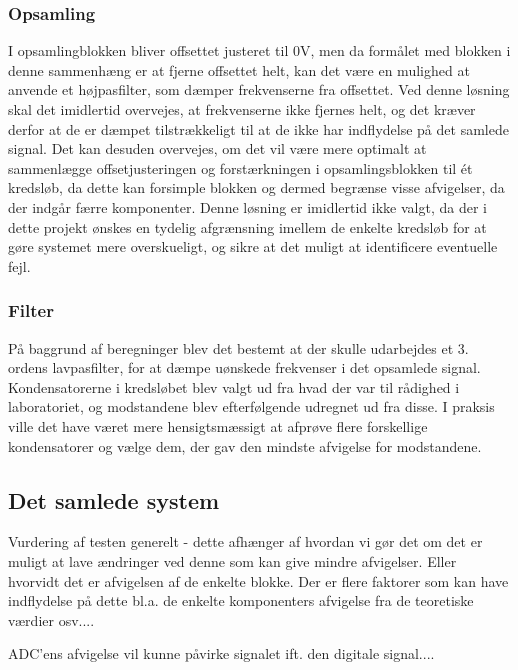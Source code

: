 \subsubsection{Opsamling}
I opsamlingblokken bliver offsettet justeret til $0$V, men da formålet med blokken i denne sammenhæng er at fjerne offsettet helt, kan det være en mulighed at anvende et højpasfilter, som dæmper frekvenserne fra offsettet. Ved denne løsning skal det imidlertid overvejes, at frekvenserne ikke fjernes helt, og det kræver derfor at de er dæmpet tilstrækkeligt til at de ikke har indflydelse på det samlede signal. Det kan desuden overvejes, om det vil være mere optimalt at sammenlægge offsetjusteringen og forstærkningen i opsamlingsblokken til ét kredsløb, da dette kan forsimple blokken og dermed begrænse visse afvigelser, da der indgår færre komponenter. Denne løsning er imidlertid ikke valgt, da der i dette projekt ønskes en tydelig afgrænsning imellem de enkelte kredsløb for at gøre systemet mere overskueligt, og sikre at det muligt at identificere eventuelle fejl. 
\subsubsection{Filter}
På baggrund af beregninger blev det bestemt at der skulle udarbejdes et 3. ordens lavpasfilter, for at dæmpe uønskede frekvenser i det opsamlede signal. Kondensatorerne i kredsløbet blev valgt ud fra hvad der var til rådighed i laboratoriet, og modstandene blev efterfølgende udregnet ud fra disse. I praksis ville det have været mere hensigtsmæssigt at afprøve flere forskellige kondensatorer og vælge dem, der gav den mindste afvigelse for modstandene.  


 
\subsection{Det samlede system}
Vurdering af testen generelt - dette afhænger af hvordan vi gør det om det er muligt at lave ændringer ved denne som kan give mindre afvigelser. Eller hvorvidt det er afvigelsen af de enkelte blokke. Der er flere faktorer som kan have indflydelse på dette bl.a. de enkelte komponenters afvigelse fra de teoretiske værdier osv....


ADC'ens afvigelse vil kunne påvirke signalet ift. den digitale signal....